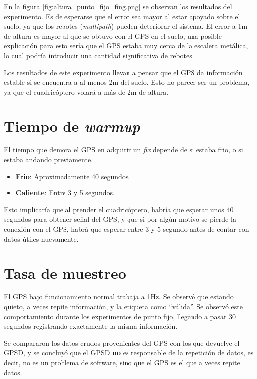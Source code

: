 \documentclass[spanish,12pt,a4paper,titlepage]{report}
\begin{document}
En la figura \ref{fig:altura_punto_fijo_fing.png} se observan los resultados del experimento. Es de esperarse que el error sea mayor al estar apoyado sobre el suelo, ya que los rebotes (\textit{multipath}) pueden deteriorar el sistema. El error a 1m de altura es mayor al que se obtuvo con el GPS en el suelo, una posible explicación para esto sería que el GPS estaba muy cerca de la escalera metálica, lo cual podría introducir una cantidad significativa de rebotes.

Los resultados de este experimento llevan a pensar que el GPS da información estable si se encuentra a al menos 2m del suelo. Esto no parece ser un problema, ya que el cuadricóptero volará a más de 2m de altura.

\newpage
\section{Tiempo de \textit{warmup}}
\label{sec:tiempo-de-warmup}

El tiempo que demora el GPS en adquirir un \textit{fix} depende de si estaba frio, o si estaba andando previamente.
\begin{itemize}
\item \textbf{Frio}: Aproximadamente 40 segundos.
\item \textbf{Caliente}: Entre 3 y 5 segundos.
\end{itemize}

Esto implicaría que al prender el cuadricóptero, habría que esperar unos 40 segundos para obtener señal del GPS, y que si por algún motivo se pierde la conexión con el GPS, habrá que esperar entre 3 y 5 segundo antes de contar con datos útiles nuevamente.

\section{Tasa de muestreo}
\label{sec:tasa-de-muestreo}

El GPS bajo funcionamiento normal trabaja a 1Hz. Se observó que estando quieto, a veces repite información, y la etiqueta como ``válida''. Se observó este comportamiento durante los experimentos de punto fijo, llegando a pasar 30 segundos registrando exactamente la misma información.

Se compararon los datos crudos provenientes del GPS con los que devuelve el GPSD, y se concluyó que el GPSD \textbf{no} es responsable de la repetición de datos, es decir, no es un problema de software, sino que el GPS es el que a veces repite datos.
\end{document}
